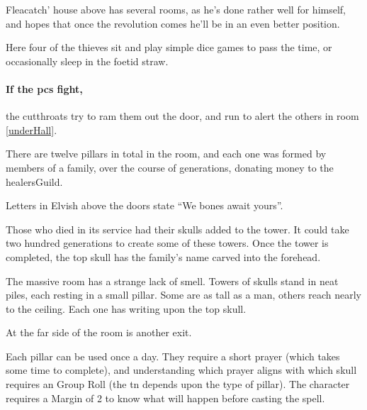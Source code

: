 Fleacatch' house above has several rooms, as he's done rather well for himself, and hopes that once the revolution comes he'll be in an even better position.



Here four of the thieves sit and play simple dice games to pass the time, or occasionally sleep in the foetid straw.

\paragraph{If the \glspl{pc} fight,}
the cutthroats try to ram them out the door, and run to alert the others in room \ref{underHall}.



There are twelve pillars in total in the room, and each one was formed by members of a family, over the course of generations, donating money to the \gls{healersGuild}.

\begin{boxtext}
  Letters in Elvish above the doors state ``We bones await yours''.
\end{boxtext}

Those who died in its service had their skulls added to the tower.
It could take two hundred generations to create some of these towers.
Once the tower is completed, the top skull has the family's name carved into the forehead.

\begin{boxtext}

  The massive room has a strange lack of smell.  Towers of skulls stand in neat piles, each resting in a small pillar.  Some are as tall as a man, others reach nearly to the ceiling.  Each one has writing upon the top skull.

  At the far side of the room is another exit.

\end{boxtext}

Each pillar can be used once a day.
They require a short prayer (which takes some time to complete), and understanding which prayer aligns with which skull requires an  Group Roll (the \gls{tn} depends upon the type of pillar).
The character requires a Margin of 2 to know what will happen before casting the spell.%

